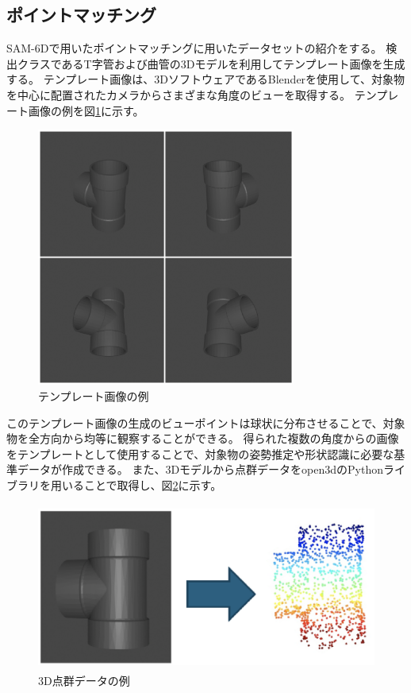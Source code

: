 \subsection{ポイントマッチング}
SAM-6Dで用いたポイントマッチングに用いたデータセットの紹介をする。
検出クラスであるT字管および曲管の3Dモデルを利用してテンプレート画像を生成する。
テンプレート画像は、3DソフトウェアであるBlenderを使用して、対象物を中心に配置されたカメラからさまざまな角度のビューを取得する。
テンプレート画像の例を図\ref{fig:4-f5}に示す。
\begin{figure}[htbt]
  \centering
   \includegraphics[height=85mm]{Figure/template.eps}
   \caption{テンプレート画像の例}
   \label{fig:4-f5}
\end{figure}

このテンプレート画像の生成のビューポイントは球状に分布させることで、対象物を全方向から均等に観察することができる。
得られた複数の角度からの画像をテンプレートとして使用することで、対象物の姿勢推定や形状認識に必要な基準データが作成できる。
また、3Dモデルから点群データをopen3dのPythonライブラリを用いることで取得し、図\ref{fig:4-f6}に示す。
\begin{figure}[htbt]
  \centering
   \includegraphics[height=55mm]{Figure/point_cloud.eps}
   \caption{3D点群データの例}
   \label{fig:4-f6}
\end{figure}

